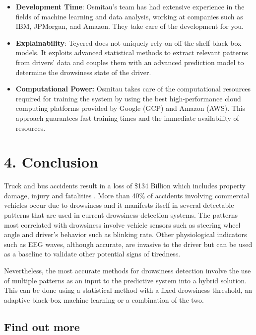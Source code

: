 \documentclass[a4paper, 12pt]{extarticle}
\begin{document}
\begin{itemize}
\item
  \textbf{Development Time}: Osmitau's team has had extensive experience
  in the fields of machine learning and data analysis, working at
  companies such as IBM, JPMorgan, and Amazon. They take care of the
  development for you.
\item
  \textbf{Explainability}: Teyered does not uniquely rely on
  off-the-shelf black-box models. It exploits advanced statistical
  methods to extract relevant patterns from drivers' data and couples
  them with an advanced prediction model to determine the drowsiness
  state of the driver.
\item
  \textbf{Computational Power:} Osmitau takes care of the computational
  resources required for training the system by using the best
  high-performance cloud computing platforms provided by Google (GCP)
  and Amazon (AWS). This approach guarantees fast training times and the
  immediate availability of resources.
\end{itemize}

\hypertarget{conclusion}{%
\section{4. Conclusion}\label{conclusion}}

Truck and bus accidents result in a loss of \$134 Billion which includes
property damage, injury and fatalities
\cite{federal_motor_carrier_safety_administration_pocket_2018}. More
than 40\% of accidents involving commercial vehicles occur due to
drowsiness \cite{flatley_sleep-related_2004} and it manifests itself in
several detectable patterns that are used in current
drowsiness-detection systems. The patterns most correlated with
drowsiness involve vehicle sensors such as steering wheel angle and
driver's behavior such as blinking rate. Other physiological indicators
such as EEG waves, although accurate, are invasive to the driver but can
be used as a baseline to validate other potential signs of tiredness.

Nevertheless, the most accurate methods for drowsiness detection involve
the use of multiple patterns as an input to the predictive system into a
hybrid solution. This can be done using a statistical method with a
fixed drowsiness threshold, an adaptive black-box machine learning or a
combination of the two.

\hypertarget{find-out-more}{%
\subsection{Find out more}\label{find-out-more}}
\end{document}

